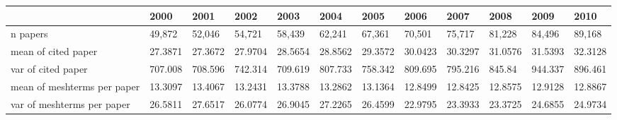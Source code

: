 \begin{tabular}{llllllllllll}
\toprule
{} &     2000 &     2001 &     2002 &     2003 &     2004 &     2005 &     2006 &     2007 &     2008 &     2009 &     2010 \\
\midrule
n papers                    &    49,872 &    52,046 &    54,721 &    58,439 &    62,241 &    67,361 &    70,501 &    75,717 &    81,228 &    84,496 &    89,168 \\
mean of cited paper         &  27.3871 &  27.3672 &  27.9704 &  28.5654 &  28.8562 &  29.3572 &  30.0423 &  30.3297 &  31.0576 &  31.5393 &  32.3128 \\
var of cited paper          &  707.008 &  708.596 &  742.314 &  709.619 &  807.733 &  758.342 &  809.695 &  795.216 &   845.84 &  944.337 &  896.461 \\
mean of meshterms per paper &  13.3097 &  13.4067 &  13.2431 &  13.3788 &  13.2862 &  13.1364 &  12.8499 &  12.8425 &  12.8575 &  12.9128 &  12.8867 \\
var of meshterms per paper  &  26.5811 &  27.6517 &  26.0774 &  26.9045 &  27.2265 &  26.4599 &  22.9795 &  23.3933 &  23.3725 &  24.6855 &  24.9734 \\
\bottomrule
\end{tabular}
